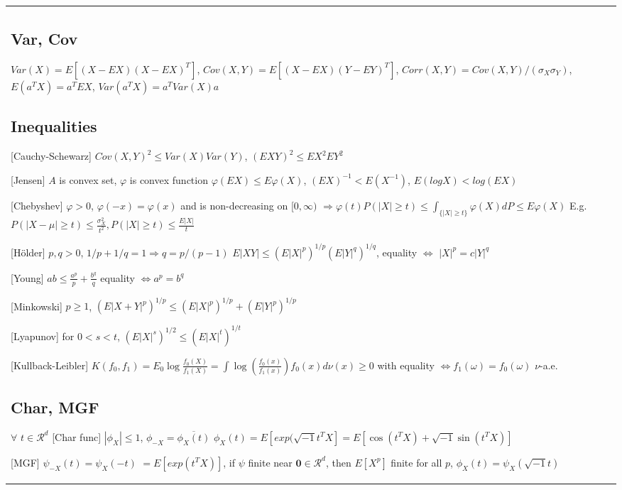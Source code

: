 \begin{tabulary}{\textwidth}{l || L}
	\subsection{Var, Cov}

	$Var(X) = E[(X-EX)(X-EX)^T]$,
	$Cov(X, Y) = E[(X-EX)(Y-EY)^T]$,
	$Corr(X, Y) = Cov(X, Y)/(\sigma_X\sigma_Y)$,
	$E(a^TX)=a^TEX$,
	$Var(a^TX)=a^TVar(X)a$

	\subsection{Inequalities}

	[Cauchy-Schewarz]
	$ Cov(X, Y)^2 \leq Var(X)Var(Y) $,
	$ (EXY)^2 \leq EX^2 EY^2 $

	[Jensen]
	$A$ is convex set, $\varphi$ is convex function
	$ \varphi(EX) \leq E\varphi(X) $,
	$(EX)^{-1} < E(X^{-1})$,
	$E(logX)<log(EX)$

	[Chebyshev]
	$\varphi > 0$,
	$\varphi(-x) = \varphi(x)$
	and is non-decreasing on $[0, \infty)$
	$\Rightarrow
		\varphi(t) P(|X|\geq t) \leq \int_{\{|X|\geq t\}} \varphi(X) dP \leq
		E\varphi(X)
	$
	E.g.
	$
		P(|X-\mu| \geq t) \leq \frac{\sigma_X^2}{t^2},
		P(|X|\geq t) \leq \frac{E|X|}{t}
	$

	[Hölder]
	$p, q > 0$, $1/p + 1/q = 1\Rightarrow q = p / (p-1)$
	$
		E|XY| \leq (E|X|^p)^{1/p}(E|Y|^q)^{1/q}
	$,
	equality  $\Leftrightarrow$
	$|X|^p = c|Y|^q$

	[Young]
	$ ab \leq \frac{a^p}{p} + \frac{b^q}{q} $
	equality $\Leftrightarrow a^p = b^q$

	[Minkowski]
	$p \geq 1$,
	$
		(E|X+Y|^p)^{1/p} \leq (E|X|^p)^{1/p} + (E|Y|^p)^{1/p}
	$

	[Lyapunov]
	for $0 < s < t$,
	$
		(E|X|^s)^{1/2} \leq (E|X|^t)^{1/t}
	$

	[Kullback-Leibler]
	$K(f_0, f_1) = E_0 \log \frac{f_0(X)}{f_1(X)} = \int \log
		\left(\frac{f_0(x)}{f_1(x)}\right) f_0(x)d\nu(x) \geq 0$
	with equality $\Leftrightarrow f_1(\omega)=f_0(\omega)$ $\nu$-a.e.

	\subsection{Char, MGF}
	$\forall$ $t\in\mathcal{R}^d$
	[Char func] $|\phi_X|\leq 1$, $\phi_{-X}=\overline{\phi_X(t)}$
	$
		\phi_X(t) = E\left[exp(\sqrt{-1}t^TX\right]=E\left[\cos(t^TX) +
			\sqrt{-1}\sin(t^TX)\right]
	$

	[MGF]
	$\psi_{-X}(t) = \psi_{X}(-t)$ $ = E\left[exp(t^TX)\right] $,
	if $\psi$ finite near $\mathbf{0}\in\mathcal{R}^d$, then
	$E[X^p]$ finite for all $p$,
	$\phi_X(t)=\psi_X(\sqrt{-1}t)$


\end{tabulary}

